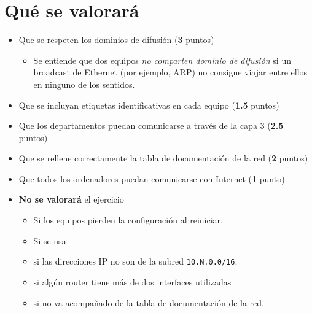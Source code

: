 \section{Qué se valorará}
\begin{itemize}
\item Que se respeten los dominios de difusión (\textbf{3} puntos)
  \begin{itemize}
  \item Se entiende que dos equipos \textit{no comparten dominio de difusión} si un broadcast de Ethernet (por ejemplo, ARP) no consigue viajar entre ellos en ninguno de los sentidos.
  \end{itemize}
\item Que se incluyan etiquetas identificativas en cada equipo (\textbf{1.5} puntos)  
\item Que los departamentos puedan comunicarse a través de la capa 3 (\textbf{2.5} puntos)
\item Que se rellene correctamente la tabla de documentación de la red (\textbf{2} puntos)
\item Que todos los ordenadores puedan comunicarse con Internet (\textbf{1} punto)
\item \textbf{No se valorará} el ejercicio
  \begin{itemize}
  \item Si los equipos pierden la configuración al reiniciar.
  \item Si se usa \texttt{}
  \item si las direcciones IP no son de la subred \texttt{10.N.0.0/16}.
  \item si algún router tiene más de dos interfaces utilizadas
  \item si no va acompañado de la tabla de documentación de la red.
  \end{itemize}
\end{itemize}




